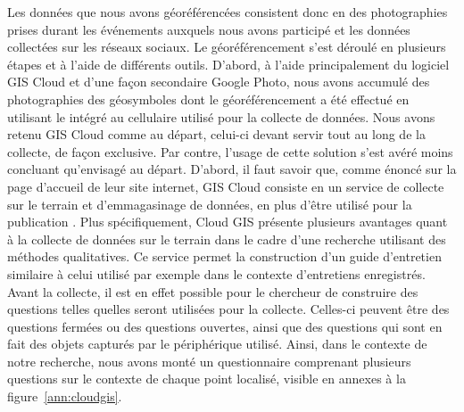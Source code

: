 Les données que nous avons géoréférencées consistent donc en des photographies prises durant les événements \lgbt{} auxquels nous avons participé et les données collectées sur les réseaux sociaux. 
Le géoréférencement s'est déroulé en plusieurs étapes et à l'aide de différents outils. 
D'abord, à l'aide principalement du logiciel GIS Cloud et d'une façon secondaire Google Photo, nous avons accumulé des photographies des géosymboles dont le géoréférencement a été effectué en utilisant le \gps{} intégré au cellulaire utilisé pour la collecte de données. 
Nous avons retenu GIS Cloud comme au départ, celui-ci devant servir tout au long de la collecte, de façon exclusive. 
Par contre, l'usage de cette solution s'est avéré moins concluant qu'envisagé au départ. 
D'abord, il faut savoir que, comme énoncé sur la page d'accueil de leur site internet, GIS Cloud consiste en un service de collecte sur le terrain et d’emmagasinage de données, en plus d'être utilisé pour la publication \citep{Cloud2014}. 
Plus spécifiquement, Cloud GIS présente plusieurs avantages quant à la collecte de données sur le terrain dans le cadre d'une recherche utilisant des méthodes qualitatives. 
Ce service permet la construction d'un guide d'entretien similaire à celui utilisé par exemple dans le contexte d'entretiens enregistrés. 
Avant la collecte, il est en effet possible pour le chercheur de construire des questions telles quelles seront utilisées pour la collecte.
Celles-ci peuvent être des questions fermées ou des questions ouvertes, ainsi que des questions qui sont en fait des objets capturés par le périphérique utilisé. 
Ainsi, dans le contexte de notre recherche, nous avons monté un questionnaire comprenant plusieurs questions sur le contexte de chaque point localisé, visible en annexes à la figure~\ref{ann:cloudgis}.

